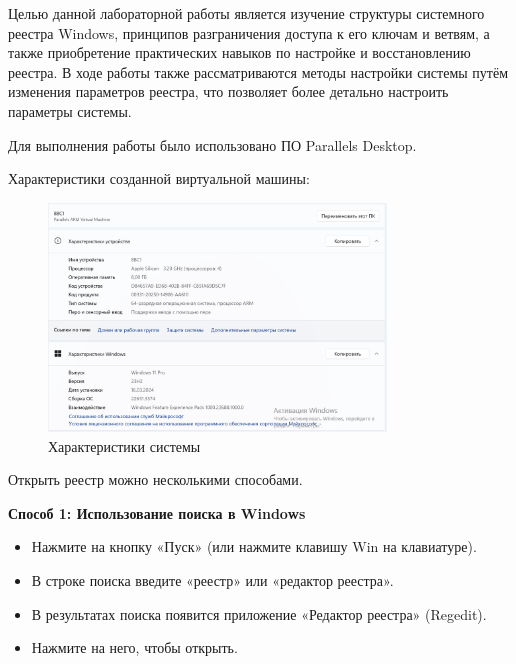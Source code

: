 \documentclass[a4paper, 14pt]{report}
\begin{document}
\setcounter{page}{2}
\tableofcontents
\newpage

Целью данной лабораторной работы является изучение структуры системного реестра Windows,
принципов разграничения доступа к его ключам и ветвям,
а также приобретение практических навыков по настройке и восстановлению реестра.
В ходе работы также рассматриваются методы настройки системы путём изменения параметров реестра, что позволяет более детально настроить параметры системы.

Для выполнения работы было использовано ПО Parallels Desktop.

Характеристики созданной виртуальной машины:
\begin{figure}[h]
    \centering
    \includegraphics[width=0.8\textwidth]{../images/vm_specs.png}
    \caption{Характеристики системы}
\end{figure}
Открыть реестр можно несколькими способами.


\textbf{Способ 1: Использование поиска в Windows}
\begin{itemize}
    \item Нажмите на кнопку «Пуск» (или нажмите клавишу Win на клавиатуре).
    \item В строке поиска введите «реестр» или «редактор реестра».
    \item В результатах поиска появится приложение «Редактор реестра» (Regedit).
    \item Нажмите на него, чтобы открыть.
\end{itemize}
\end{document}
